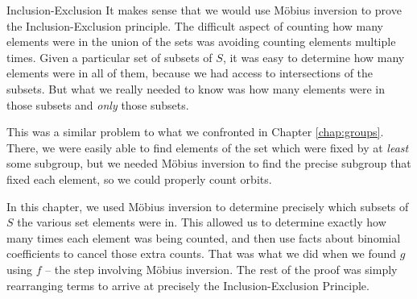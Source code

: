 \documentclass[12pt]{pom_thesis}
\begin{document}
\begin{chapter}{Inclusion-Exclusion}
It makes sense that we would use M\"obius inversion to prove the Inclusion-Exclusion principle. The difficult aspect of counting how many elements were in the union of the sets was avoiding counting elements multiple times. Given a particular set of subsets of $S$, it was easy to determine how many elements were in all of them, because we had access to intersections of the subsets. But what we really needed to know was how many elements were in those subsets and \emph{only} those subsets. 

This was a similar problem to what we confronted in Chapter \ref{chap:groups}. There, we were easily able to find elements of the set which were fixed by at \emph{least} some subgroup, but we needed M\"obius inversion to find the precise subgroup that fixed each element, so we could properly count orbits. 

In this chapter, we used M\"obius inversion to determine precisely which subsets of $S$ the various set elements were in. This allowed us to determine exactly how many times each element was being counted, and then use facts about binomial coefficients to cancel those extra counts. That was what we did when we found $g$ using $f$ -- the step involving M\"obius inversion. The rest of the proof was simply rearranging terms to arrive at precisely the Inclusion-Exclusion Principle. 

\end{chapter}
\end{document}
